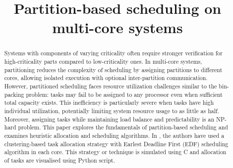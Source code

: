 \documentclass[conference]{IEEEtran}
\begin{document}
\title{Partition-based scheduling on multi-core systems\\
}

\author{
}

\maketitle

\begin{abstract}
Systems with components of varying criticality often require stronger verification for high-criticality parts compared to low-criticality ones. In multi-core systems, partitioning reduces the complexity of scheduling by assigning partitions to different cores, allowing isolated execution with optional inter-partition communication. However, partitioned scheduling faces resource utilization challenges similar to the bin-packing problem: tasks may fail to be assigned to any processor even when sufficient total capacity exists. This inefficiency is particularly severe when tasks have high individual utilization, potentially limiting system resource usage to as little as half. Moreover, assigning tasks while maintaining load balance and predictability is an NP-hard problem. This paper explores the fundamentals of partition-based scheduling and examines heuristic allocation and scheduling algorithms. In \cite{AbdallahGB24}, the authors have used a clustering-based task allocation strategy with Earlest Deadline First (EDF) scheduling algorithm in each core. This strategy or technique is simulated using C and allocation of tasks are visualised using Python script.


\end{abstract}
\end{document}
